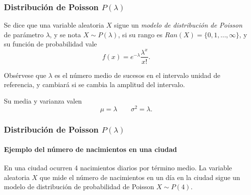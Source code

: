 \begin{frame}
\frametitle{Distribución de Poisson $P(\lambda)$}
\begin{definicion}
Se dice que una variable aleatoria $X$ sigue un \emph{modelo de distribución de Poisson} de parámetro $\lambda$, y se nota $X\sim P(\lambda)$, si su rango es $Ran(X) = \{0,1,\ldots,\infty\}$, y su función de probabilidad vale
\[
f(x) = e^{-\lambda}\frac{\lambda^x}{x!}.
\]
\end{definicion}

Obsérvese que $\lambda$ es el número medio de sucesos en el intervalo unidad de referencia, y cambiará si se cambia la amplitud del intervalo.

Su media y varianza valen
\[
\mu = \lambda \qquad \sigma^2 = \lambda.
\]

\end{frame}


\begin{frame}
\frametitle{Distribución de Poisson $P(\lambda)$}
\framesubtitle{Ejemplo del número de nacimientos en una ciudad}
En una ciudad ocurren 4 nacimientos diarios por término medio. 
La variable aleatoria $X$ que mide el número de nacimientos en un día en la ciudad sigue un modelo de distribución de probabilidad de Poisson $X\sim P(4)$.
\begin{center}
  \end{center}

\end{frame}


